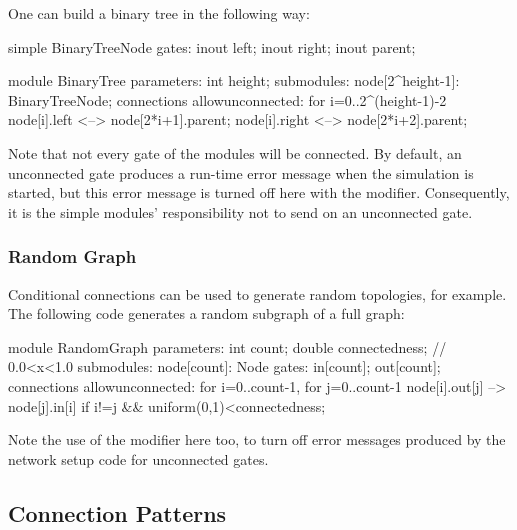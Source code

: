 One can build a binary tree in the following way:

\begin{ned}
simple BinaryTreeNode {
    gates:
        inout left;
        inout right;
        inout parent;
}

module BinaryTree {
    parameters:
        int height;
    submodules:
        node[2^height-1]: BinaryTreeNode;
    connections allowunconnected:
        for i=0..2^(height-1)-2 {
            node[i].left <--> node[2*i+1].parent;
            node[i].right <--> node[2*i+2].parent;
        }
}
\end{ned}

Note that not every gate of the modules will be connected. By default,
an unconnected gate produces a run-time error message when the
simulation is started, but this error message is turned off here with
the  modifier.
Consequently, it is the simple modules' responsibility not to send
on an unconnected gate.



\subsubsection{Random Graph}
\label{sec:ned-lang:random-graph-example}

Conditional connections can be used to generate random
topologies, for example. The following code
generates a random subgraph of a full graph:

\begin{ned}
module RandomGraph {
    parameters:
        int count;
        double connectedness; // 0.0<x<1.0
    submodules:
        node[count]: Node {
            gates:
                in[count];
                out[count];
        }
    connections allowunconnected:
        for i=0..count-1, for j=0..count-1 {
            node[i].out[j] --> node[j].in[i]
                if i!=j && uniform(0,1)<connectedness;
        }
}
\end{ned}

Note the use of the  modifier
here too, to turn off error messages produced by the network setup code
for unconnected gates.


\subsection{Connection Patterns}
\label{sec:ned-lang:connection-design-patterns}


